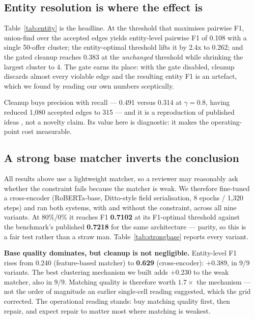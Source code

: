 \documentclass[conference]{IEEEtran}
\begin{document}
\subsection{Entity resolution is where the effect is}
\label{sec:entity}


Table~\ref{tab:entity} is the headline. At the threshold that maximises pairwise F1, union-find over the
accepted edges yields entity-level pairwise F1 of 0.108 with a single 50-offer cluster; the entity-optimal
threshold lifts it by 2.4x to 0.262; and the gated cleanup reaches 0.383 at the \emph{unchanged} threshold while
shrinking the largest cluster to 4. The gate earns its place: with the gate disabled, cleanup discards
almost every violable edge and the resulting entity F1 is an artefact, which we found by reading our own
numbers sceptically.

Cleanup buys precision with recall --- 0.491 versus 0.314 at $\gamma=0.8$, having reduced 1{,}080 accepted
edges to 315 --- and it is a reproduction of published ideas \cite{dmeer2025transclean,dmeer2025gralmatch},
not a novelty claim. Its value here is diagnostic: it makes the operating-point cost measurable.

\subsection{A strong base matcher inverts the conclusion}
\label{sec:strongbase}
All results above use a lightweight matcher, so a reviewer may reasonably ask whether the constraint fails
because the matcher is weak. We therefore fine-tuned a cross-encoder (RoBERTa-base, Ditto-style field
serialisation, 8 epochs / 1{,}320 steps) and ran both systems, with and without the constraint, across all
nine variants. At 80\%/0\% it reaches F1 \textbf{0.7102} at its F1-optimal threshold against the
benchmark's published \textbf{0.7218} for the same architecture --- parity, so this is a fair test rather
than a straw man. Table~\ref{tab:strongbase} reports every variant.


\textbf{Base quality dominates, but cleanup is not negligible.} Entity-level F1 rises from 0.240
(feature-based matcher) to \textbf{0.629} (cross-encoder): $+0.389$, in 9/9 variants. The best clustering
mechanism we built adds $+0.230$ to the weak matcher, also in 9/9. Matching quality is therefore worth
$1.7\times$ the mechanism --- not the order of magnitude an earlier single-cell reading suggested, which
the grid corrected. The operational reading stands: buy matching quality first, then repair, and expect
repair to matter most where matching is weakest.
\end{document}
